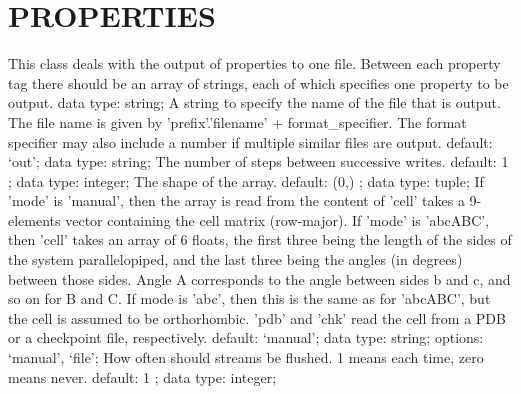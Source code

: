 \section{PROPERTIES}
\label{PROPERTIES}
\begin{ipifield}{}%
{This class deals with the output of properties to one file. Between each property tag there should be an array of strings, each of which specifies one property to be output.}%
{data type: string; }%
{%
{A string to specify the name of the file that is output. The file name is given by 'prefix'.'filename' + format\_specifier. The format specifier may also include a number if multiple similar files are output.}%
{default: `out'; data type: string; }%
%
{The number of steps between successive writes.}%
{default:  1 ; data type: integer; }%
%
{The shape of the array.}%
{default:  (0,) ; data type: tuple; }%
%
{If 'mode' is 'manual', then the array is read from the content of 'cell' takes a 9-elements vector containing the cell matrix (row-major). If 'mode' is 'abcABC', then 'cell' takes an array of 6 floats, the first three being the length of the sides of the system parallelopiped, and the last three being the angles (in degrees) between those sides. Angle A corresponds to the angle between sides b and c, and so on for B and C. If mode is 'abc', then this is the same as for 'abcABC', but the cell is assumed to be orthorhombic. 'pdb' and 'chk' read the cell from a PDB or a checkpoint file, respectively.}%
{default: `manual'; data type: string; options: `manual', `file'; }%
%
{How often should streams be flushed. 1 means each time, zero means never.}%
{default:  1 ; data type: integer; }%
}
\end{ipifield}
